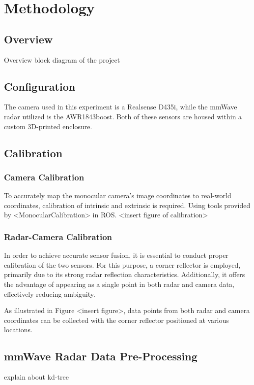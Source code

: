 
\chapter{Methodology}\label{chap:related_works}

\section{Overview}\label{sec:2-overview}
Overview block diagram of the project

\section{Configuration}\label{sec:2-spec}
The camera used in this experiment is a Realsense D435i, while the mmWave radar utilized is the AWR1843boost.
Both of these sensors are housed within a custom 3D-printed enclosure.

\section{Calibration}\label{sec:2-calibration}
\subsection*{Camera Calibration}
To accurately map the monocular camera's image coordinates to real-world coordinates, calibration of intrinsic and extrinsic is required.
Using tools provided by <MonocularCalibration> in ROS.%
<insert figure of calibration>

\subsection*{Radar-Camera Calibration}
In order to achieve accurate sensor fusion, it is essential to conduct proper calibration of the two sensors. 
For this purpose, a corner reflector is employed, primarily due to its strong radar reflection characteristics. 
Additionally, it offers the advantage of appearing as a single point in both radar and camera data, effectively reducing ambiguity.

As illustrated in Figure <insert figure>, data points from both radar 
and camera coordinates can be collected with the corner reflector positioned at various locations.



\section{mmWave Radar Data Pre-Processing}\label{sec:2-kd_tree}
explain about kd-tree

